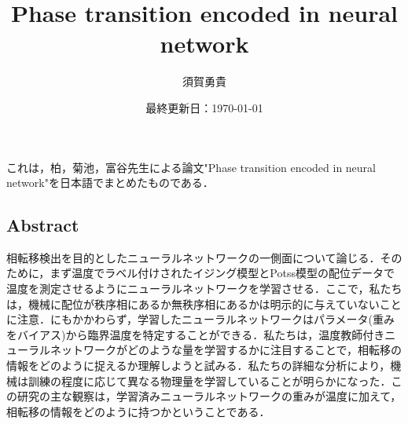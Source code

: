 \documentclass[a4paper,11pt]{jsarticle}
\begin{document}
\title{Phase transition encoded in neural network}
\author{須賀勇貴}
\date{最終更新日：\today}
\maketitle
これは，柏，菊池，富谷先生による論文"Phase transition encoded in neural network"を日本語でまとめたものである．\par

\subsection*{Abstract}
相転移検出を目的としたニューラルネットワークの一側面について論じる．そのために，まず温度でラベル付けされたイジング模型とPotss模型の配位データで温度を測定させるようにニューラルネットワークを学習させる．ここで，私たちは，機械に配位が秩序相にあるか無秩序相にあるかは明示的に与えていないことに注意．にもかかわらず，学習したニューラルネットワークはパラメータ(重みをバイアス)から臨界温度を特定することができる．私たちは，温度教師付きニューラルネットワークがどのような量を学習するかに注目することで，相転移の情報をどのように捉えるか理解しようと試みる．私たちの詳細な分析により，機械は訓練の程度に応じて異なる物理量を学習していることが明らかになった．この研究の主な観察は，学習済みニューラルネットワークの重みが温度に加えて，相転移の情報をどのように持つかということである．
\end{document}
